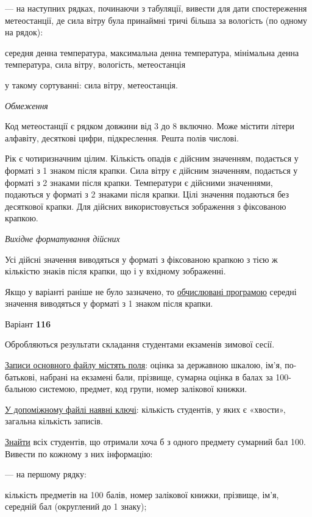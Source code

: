 \documentclass[11pt, ukrainian]{article}
\begin{document}
{\noindent}--- на наступних рядках, починаючи з табуляції, вивести для дати спостереження метеостанції, де сила вітру була принаймні тричі більша за вологість (по одному на рядок):\par
середня денна температура, максимальна денна температура, мінімальна денна температура, сила вітру, вологість, метеостанція

{\noindent}у такому сортуванні: сила вітру, метеостанція.


\bigskip\textit{Обмеження}

Код метеостанції є рядком довжини від 3 до 8 включно.
Може містити літери алфавіту, десяткові цифри, підкреслення. Решта полів числові.

Рік є чотиризначним цілим.
Кількість опадів є дійсним значенням, подається у форматі з 1 знаком після крапки.
Сила вітру є дійсним значенням, подається у форматі з 2 знаками після крапки.
Температури є дійсними значеннями, подаються у форматі з 2 знаками після крапки.
Цілі значення подаються без десяткової крапки.
Для дійсних використовується зображення з фіксованою крапкою.

\textit{Вихідне форматування дійсних}

Усі дійсні значення виводяться у форматі з фіксованою крапкою з тією ж кількістю знаків після крапки, що і у вхідному зображенні.

Якщо у варіанті раніше не було зазначено, то \underline{обчислювані програмою} середні значення виводяться у форматі з 1 знаком після крапки.




\par
\newpage
{\center Варіант  \No \textbf { 116 }\par}
\bigskip
Обробляються результати складання студентами екзаменів зимової сесії.

\underline{Записи основного файлу містять поля}: оцінка за державною шкалою, ім’я, по-батькові, набрані на екзамені бали, прізвище, сумарна оцінка в балах за 100-бальною системою, предмет, код групи, номер залікової книжки.

\underline{У допоміжному файлі наявні ключі}: кількість студентів, у яких є «хвости», загальна кількість записів.

\underline{Знайти} всіх студентів, що отримали хоча б з одного предмету сумарний бал 100. Вивести по кожному з них інформацію:\par
{\noindent}--- на першому рядку:\par
кількість предметів на 100 балів, номер залікової книжки, прізвище, ім’я, середній бал (округлений до 1 знаку);
\end{document}

